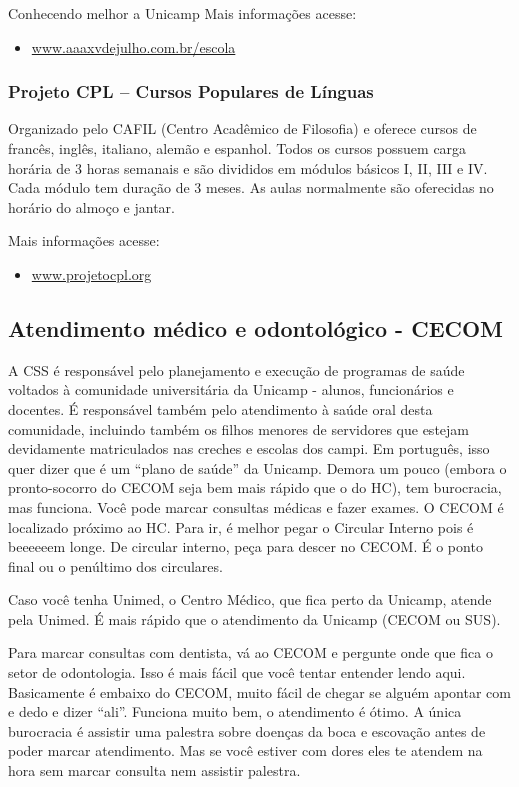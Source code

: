 \begin{story}{Conhecendo melhor a Unicamp}
Mais informações acesse:

\begin{itemize}
\item \url{www.aaaxvdejulho.com.br/escola}
\end{itemize}

\subsubsection*{Projeto CPL -- Cursos Populares de Línguas}

Organizado pelo CAFIL (Centro Acadêmico de Filosofia) e oferece cursos de francês, inglês, italiano, alemão e espanhol. Todos os cursos possuem carga horária de 3 horas semanais e são divididos em módulos básicos I, II, III e IV. Cada módulo tem duração de 3 meses. As aulas normalmente são oferecidas no horário do almoço e jantar.

Mais informações acesse:

\begin{itemize}
\item \url{www.projetocpl.org}
\end{itemize}

\subsection*{Atendimento médico e odontológico - CECOM}

A CSS é responsável pelo planejamento e execução de programas de saúde voltados à comunidade universitária da Unicamp - alunos, funcionários e docentes. É responsável também pelo atendimento à saúde oral desta comunidade, incluindo também os filhos menores de servidores que estejam devidamente matriculados nas creches e escolas dos campi. Em português, isso quer dizer que é um ``plano de saúde'' da Unicamp. Demora um pouco (embora o pronto-socorro do CECOM seja bem mais rápido que o do HC), tem burocracia, mas funciona. Você pode marcar consultas médicas e fazer exames. O CECOM é localizado próximo ao HC. Para ir, é melhor pegar o Circular Interno pois é beeeeeem longe. De circular interno, peça para descer no CECOM. É o ponto final ou o penúltimo dos circulares.

Caso você tenha Unimed, o Centro Médico, que fica perto da Unicamp, atende pela Unimed. É mais rápido que o atendimento da Unicamp (CECOM ou SUS).

Para marcar consultas com dentista, vá ao CECOM e pergunte onde que fica o setor de odontologia. Isso é mais fácil que você tentar entender lendo aqui. Basicamente é embaixo do CECOM, muito fácil de chegar se alguém apontar com e dedo e dizer ``ali''. Funciona muito bem, o atendimento é ótimo. A única burocracia é assistir uma palestra sobre doenças da boca e escovação antes de poder marcar atendimento. Mas se você estiver com dores eles te atendem na hora sem marcar consulta nem assistir palestra.


\end{story}
